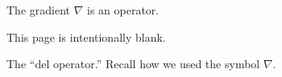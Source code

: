 \documentclass{article}
\begin{document}
The gradient $\nabla$ is an operator.%

\clearpage

This page is intentionally blank.

\clearpage

The ``del operator.'' Recall how we used the symbol $\nabla$.%

\clearpage


\printindex
\end{document}
